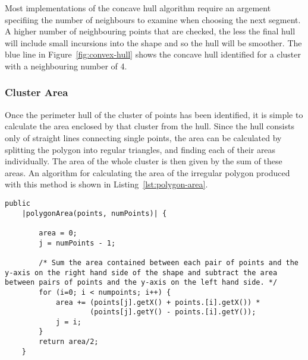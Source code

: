Most implementations of the concave hull algorithm require an argement
specifiing the number of neighbours to examine when choosing the next segment.
A higher number of neighbouring points that are checked, the less the final
hull will include small incursions into the shape and so the hull will be
smoother. The blue line in Figure~\ref{fig:convex-hull} shows the concave hull
identified for a cluster with a neighbouring number of 4.

\cite{lee2002polygonization}

\cite{estivill2000autoclust}

\cite{xia2006border}

\cite{lee1980two}

\subsubsection{Cluster Area}
\label{ssub:cluster_area_point}

Once the perimeter hull of the cluster of points has been identified, it is
simple to calculate the area enclosed by that cluster from the hull. Since the
hull consists only of straight lines connecting single points, the area can be
calculated by splitting the polygon into regular triangles, and finding each of
their areas individually. The area of the whole cluster is then given by the
sum of these areas. An algorithm for calculating the area of the irregular
polygon produced with this method is shown in Listing~\ref{lst:polygon-area}.

\begin{center}
\begin{minipage}{\textwidth}
	\begin{lstlisting}[caption={[Code to find the area of an irregular
	polygon.]Code to find the area of an irregular polygon.  Adapted
	from~\cite{finley2006poly}}, label=lst:polygon-area] public
	|polygonArea(points, numPoints)| {

		area = 0;
		j = numPoints - 1;

		/* Sum the area contained between each pair of points and the y-axis on the right hand side of the shape and subtract the area between pairs of points and the y-axis on the left hand side. */
		for (i=0; i < numpoints; i++) {
			area += (points[j].getX() + points.[i].getX()) *
		        	(points[j].getY() - points.[i].getY());
			j = i;
		}
		return area/2;
	}
\end{lstlisting}
\end{minipage}
\end{center}
